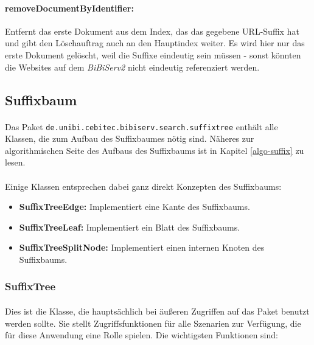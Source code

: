 \paragraph{removeDocumentByIdentifier:} Entfernt das erste Dokument aus dem Index, das das gegebene URL-Suffix hat und gibt den Löschauftrag auch an den Hauptindex weiter. Es wird hier nur das erste Dokument gelöscht, weil die Suffixe eindeutig sein müssen - sonst könnten die Websites auf dem \textit{BiBiServ2} nicht eindeutig referenziert werden.

\subsection{Suffixbaum}
\label{arch-suffix}

\paragraph{} Das Paket \texttt{de.unibi.cebitec.bibiserv.search.suffixtree} enthält alle \\Klassen, die zum Aufbau des Suffixbaumes nötig sind. Näheres zur algorithmischen Seite des Aufbaus des Suffixbaums ist in Kapitel \ref{algo-suffix} zu lesen.
\paragraph{} Einige Klassen entsprechen dabei ganz direkt Konzepten des Suffixbaums:
\begin{itemize}
\item \textbf{SuffixTreeEdge:} Implementiert eine Kante des Suffixbaums.
\item \textbf{SuffixTreeLeaf:} Implementiert ein Blatt des Suffixbaums.
\item \textbf{SuffixTreeSplitNode:} Implementiert einen internen Knoten des Suffixbaums.
\end{itemize}

\subsubsection{SuffixTree}

\paragraph{} Dies ist die Klasse, die hauptsächlich bei äußeren Zugriffen auf das Paket benutzt werden sollte. Sie stellt Zugriffsfunktionen für alle Szenarien zur Verfügung, die für diese Anwendung eine Rolle spielen. Die wichtigsten Funktionen sind:

